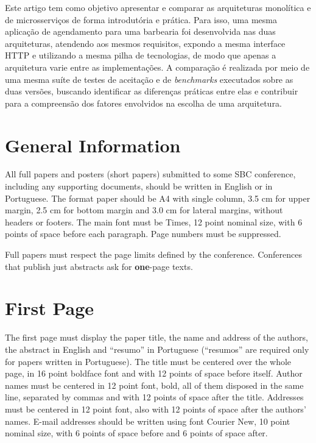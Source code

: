 \documentclass[12pt]{article}
\begin{document}
Este artigo tem como objetivo apresentar e comparar as arquiteturas monolítica e de microsserviços de forma introdutória e prática. Para isso, uma mesma aplicação de agendamento para uma barbearia foi desenvolvida nas duas arquiteturas, atendendo aos mesmos requisitos, expondo a mesma interface HTTP e utilizando a mesma pilha de tecnologias, de modo que apenas a arquitetura varie entre as implementações. A comparação é realizada por meio de uma mesma suíte de testes de aceitação e de \textit{benchmarks} executados sobre as duas versões, buscando identificar as diferenças práticas entre elas e contribuir para a compreensão dos fatores envolvidos na escolha de uma arquitetura.

\section{General Information}

All full papers and posters (short papers) submitted to some SBC conference,
including any supporting documents, should be written in English or in
Portuguese. The format paper should be A4 with single column, 3.5 cm for upper
margin, 2.5 cm for bottom margin and 3.0 cm for lateral margins, without
headers or footers. The main font must be Times, 12 point nominal size, with 6
points of space before each paragraph. Page numbers must be suppressed.

Full papers must respect the page limits defined by the conference.
Conferences that publish just abstracts ask for \textbf{one}-page texts.

\section{First Page} \label{sec:firstpage}

The first page must display the paper title, the name and address of the
authors, the abstract in English and ``resumo'' in Portuguese (``resumos'' are
required only for papers written in Portuguese). The title must be centered
over the whole page, in 16 point boldface font and with 12 points of space
before itself. Author names must be centered in 12 point font, bold, all of
them disposed in the same line, separated by commas and with 12 points of
space after the title. Addresses must be centered in 12 point font, also with
12 points of space after the authors' names. E-mail addresses should be
written using font Courier New, 10 point nominal size, with 6 points of space
before and 6 points of space after.
\end{document}
